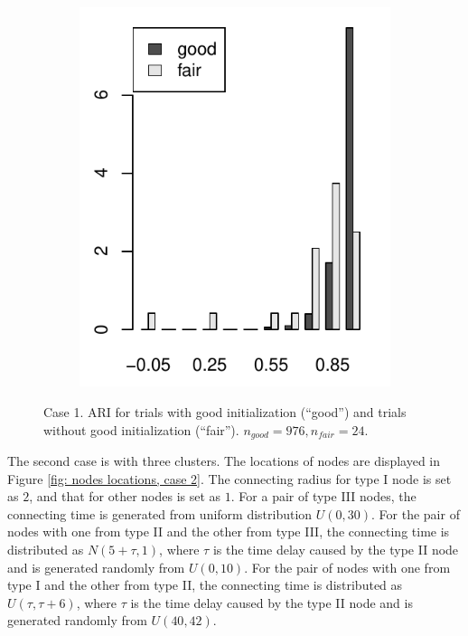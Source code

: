 \begin{figure}
\begin{subfigure}{.45\textwidth}
\includegraphics[width=\linewidth]{../simulation/plots/ARI_hist_case1}
\caption{}
\label{fig: ARI hist, case 1}
\end{subfigure}
\caption{Case 1. ARI for trials with good initialization (``good'') and trials without good initialization (``fair'').
$n_{good}=976, n_{fair}=24.$
}
\label{fig: ARI, case1}
\end{figure}




The second case is with three clusters.
The locations of nodes are displayed in Figure \ref{fig: nodes locations, case 2}.
The connecting radius for type I node is set as $2$, and that for other nodes is set as $1$. 
For a pair of type III nodes, the connecting time is generated from uniform distribution $U(0,30)$.
For the pair of nodes with one from type II and the other from type III, 
the connecting time is distributed as $N(5+\tau,1)$, where $\tau$ is the time delay caused by the type II node and is generated randomly from $U(0,10)$.
For the pair of nodes with one from type I and the other from type II, the connecting time is distributed as $U(\tau,\tau+6)$, where $\tau$ is the time delay caused by the type II node and is generated randomly from $U(40,42)$.

